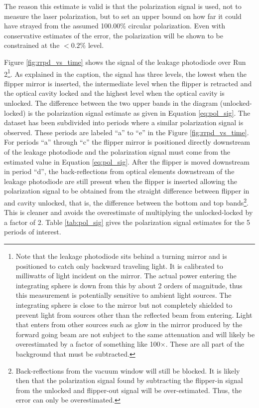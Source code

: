 The reason this estimate is valid is that the polarization signal is used, not to measure the laser polarization, but to set an upper bound on how far it could have strayed from the assumed 100.00\% circular polarization. Even with conservative estimates of the error, the polarization will be shown to be constrained at the $< 0.2\%$ level.

Figure \ref{fig:rrpd_vs_time} shows the signal of the leakage photodiode over Run 2\footnote{Note that the leakage photodiode sits behind a turning mirror and is positioned to catch only backward traveling light. It is calibrated to milliwatts of light incident on the mirror.  The actual power entering the integrating sphere is down from this by about 2 orders of magnitude, thus this measurement is potentially sensitive to ambient light sources. The integrating sphere is close to the mirror but not completely shielded to prevent light from sources other than the reflected beam from entering. Light that enters from other sources such as glow in the mirror produced by the forward going beam are not subject to the same attenuation and will likely be overestimated by a factor of something like 100$\times$. These are all part of the background that must be subtracted.}. As explained in the caption, the signal has three levels, the lowest when the flipper mirror is inserted, the intermediate level when the flipper is retracted and the optical cavity locked and the highest level when the optical cavity is unlocked. The difference between the two upper bands in the diagram (unlocked-locked) is the polarization signal estimate as given in Equation \ref{eq:pol_sig}. The dataset has been subdivided into periods where a similar polarization signal is observed. These periods are labeled ``a'' to ``e'' in the Figure \ref{fig:rrpd_vs_time}. For periods ``a'' through  ``c'' the flipper mirror is positioned directly downstream of the leakage photodiode and the polarization signal must come from the estimated value in Equation \ref{eq:pol_sig}. After the flipper is moved downstream in period ``d'', the back-reflections from optical elements downstream of the leakage photodiode are still present when the flipper is inserted allowing the polarization signal to be obtained from the straight difference between flipper in and cavity unlocked, that is, the difference between the bottom and top bands\footnote{Back-reflections from the vacuum window will still be blocked. It is likely then that the polarization signal found by subtracting the flipper-in signal from the unlocked and flipper-out signal will be over-estimated. Thus, the error can only be overestimated.}. This is cleaner and avoids the overestimate of multiplying the unlocked-locked by a factor of 2. Table \ref{tab:pol_sig} gives the polarization signal estimates for the 5 periods of interest.

